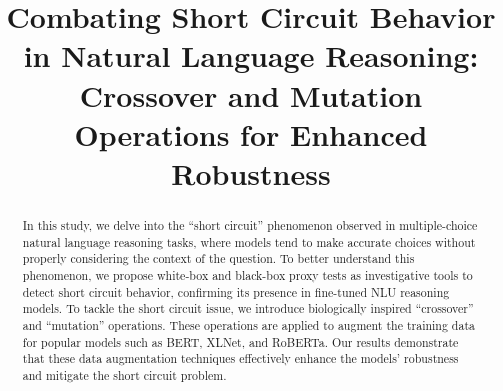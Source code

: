 \documentclass{ecai}  %
\begin{document}
\begin{frontmatter}

\title{Combating Short Circuit Behavior in Natural Language Reasoning: Crossover and Mutation Operations for Enhanced Robustness}
\begin{abstract}
In this study, we delve into the ``short circuit'' phenomenon observed in multiple-choice natural language reasoning tasks, where models tend to make accurate choices without properly considering the context of the question. To better understand this phenomenon, we propose white-box and black-box proxy tests as investigative tools to detect short circuit behavior, confirming its presence in fine-tuned NLU reasoning models.
To tackle the short circuit issue, we introduce biologically inspired ``crossover'' and ``mutation'' operations. These operations are applied to augment the training data for popular models such as BERT, XLNet, and RoBERTa. Our results demonstrate that these data augmentation techniques effectively enhance the models' robustness and mitigate the short circuit problem.
\end{abstract}



\end{frontmatter}






\end{document}
